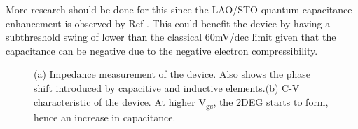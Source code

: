 \documentclass[11pt,a4paper]{report}
\begin{document}
More research should be done for this since the LAO/STO quantum capacitance enhancement is observed by Ref \cite{li_Large_capacitance_enhancement_2011}. This could benefit the device by having a subthreshold swing of lower than the classical 60mV/dec limit given that the capacitance can be negative due to the negative electron compressibility.



\begin{figure}
    \begin{minipage}{.5\linewidth}
    \centering
    \end{minipage}
    \begin{minipage}{.5\linewidth}
    \centering
    \end{minipage}\par\medskip
    \caption{(a) Impedance measurement of the device. Also shows the phase shift introduced by capacitive and inductive elements.(b) C-V characteristic of the device. At higher V\textsubscript{gs}, the 2DEG starts to form, hence an increase in capacitance.}
    \label{fig:CV_Impedance_figure}
\end{figure}
\end{document}
